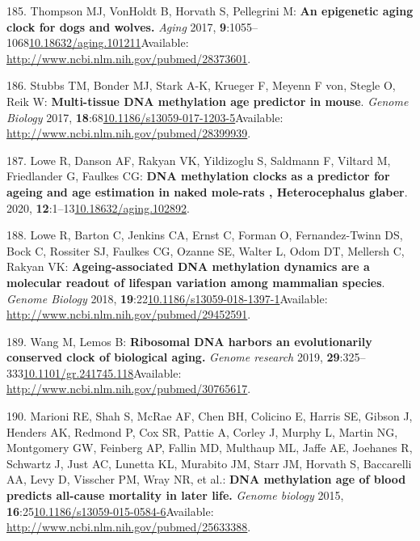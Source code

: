 \documentclass[
]{book}
\begin{document}
\leavevmode\hypertarget{ref-Thompson2017}{}%
185. Thompson MJ, VonHoldt B, Horvath S, Pellegrini M: \textbf{An epigenetic aging clock for dogs and wolves.} \emph{Aging} 2017, \textbf{9}:1055--1068\href{https://doi.org/10.18632/aging.101211}{10.18632/aging.101211}Available: \url{http://www.ncbi.nlm.nih.gov/pubmed/28373601}.

\leavevmode\hypertarget{ref-Stubbs2017}{}%
186. Stubbs TM, Bonder MJ, Stark A-K, Krueger F, Meyenn F von, Stegle O, Reik W: \textbf{Multi-tissue DNA methylation age predictor in mouse}. \emph{Genome Biology} 2017, \textbf{18}:68\href{https://doi.org/10.1186/s13059-017-1203-5}{10.1186/s13059-017-1203-5}Available: \url{http://www.ncbi.nlm.nih.gov/pubmed/28399939}.

\leavevmode\hypertarget{ref-Lowe2020}{}%
187. Lowe R, Danson AF, Rakyan VK, Yildizoglu S, Saldmann F, Viltard M, Friedlander G, Faulkes CG: \textbf{DNA methylation clocks as a predictor for ageing and age estimation in naked mole-rats , Heterocephalus glaber}. 2020, \textbf{12}:1--13\href{https://doi.org/10.18632/aging.102892}{10.18632/aging.102892}.

\leavevmode\hypertarget{ref-Lowe2018}{}%
188. Lowe R, Barton C, Jenkins CA, Ernst C, Forman O, Fernandez-Twinn DS, Bock C, Rossiter SJ, Faulkes CG, Ozanne SE, Walter L, Odom DT, Mellersh C, Rakyan VK: \textbf{Ageing-associated DNA methylation dynamics are a molecular readout of lifespan variation among mammalian species}. \emph{Genome Biology} 2018, \textbf{19}:22\href{https://doi.org/10.1186/s13059-018-1397-1}{10.1186/s13059-018-1397-1}Available: \url{http://www.ncbi.nlm.nih.gov/pubmed/29452591}.

\leavevmode\hypertarget{ref-Wang2019}{}%
189. Wang M, Lemos B: \textbf{Ribosomal DNA harbors an evolutionarily conserved clock of biological aging.} \emph{Genome research} 2019, \textbf{29}:325--333\href{https://doi.org/10.1101/gr.241745.118}{10.1101/gr.241745.118}Available: \url{http://www.ncbi.nlm.nih.gov/pubmed/30765617}.

\leavevmode\hypertarget{ref-Marioni2015}{}%
190. Marioni RE, Shah S, McRae AF, Chen BH, Colicino E, Harris SE, Gibson J, Henders AK, Redmond P, Cox SR, Pattie A, Corley J, Murphy L, Martin NG, Montgomery GW, Feinberg AP, Fallin MD, Multhaup ML, Jaffe AE, Joehanes R, Schwartz J, Just AC, Lunetta KL, Murabito JM, Starr JM, Horvath S, Baccarelli AA, Levy D, Visscher PM, Wray NR, et al.: \textbf{DNA methylation age of blood predicts all-cause mortality in later life.} \emph{Genome biology} 2015, \textbf{16}:25\href{https://doi.org/10.1186/s13059-015-0584-6}{10.1186/s13059-015-0584-6}Available: \url{http://www.ncbi.nlm.nih.gov/pubmed/25633388}.
\end{document}
